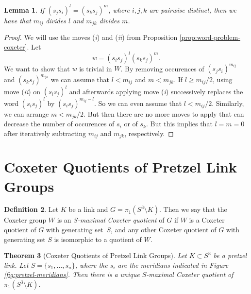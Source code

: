 \documentclass[11pt]{article}
\newtheorem{theorem}{Theorem}[section]
\newtheorem{lemma}[theorem]{Lemma}
\theoremstyle{definition}
\newtheorem{definition}[theorem]{Definition}
\begin{document}
\begin{lemma}\label{lem:divisors}
If $(s_js_i)^l = (s_ks_j)^m$, where $i,j,k$ are pairwise distinct, then we have that $m_{ij}$ divides $l$ and $m_{jk}$ divides $m$.
\end{lemma}

\begin{proof}
We will use the moves (\textit{i}) and (\textit{ii}) from Proposition \ref{prop:word-problem-coxeter}. Let
$$w = (s_is_j)^l(s_ks_j)^m.$$
We want to show that $w$ is trivial in $W$. By removing occurences of $(s_js_i)^{m_{ij}}$ and $(s_ks_j)^{m_{jk}}$ we can assume that $l < m_{ij}$ and $m < m_{jk}$. If $l \geq m_{ij}/2$, using move (\textit{ii}) on $(s_is_j)^l$ and afterwards applying move (\textit{i}) successively replaces the word $(s_is_j)^l$ by $(s_is_j)^{m_{ij}-l}$. So we can even assume that $l < m_{ij}/2$. Similarly, we can arrange $m < m_{jk}/2$. But then there are no more moves to apply that can decrease the number of occurences of $s_i$ or of $s_k$. But this implies that $l=m=0$ after iteratively subtracting $m_{ij}$ and $m_{jk}$, respectively.
\end{proof}

\section{Coxeter Quotients of Pretzel Link Groups}\label{sec:coxeter-quotients}

\begin{definition}
Let $K$ be a link and $G = \pi_1(S^3 \setminus K)$. Then we say that the Coxeter group
$W$ is an \textit{$S$-maximal Coxeter quotient} of $G$ if $W$ is a Coxeter quotient of $G$ with generating set~$S$, and any other Coxeter quotient of $G$ with generating set $S$ is isomorphic to a quotient of $W$.
\end{definition}


\begin{theorem}[Coxeter Quotients of Pretzel Link Groups]\label{thm:pretzel-coxeter}
Let $K\subset S^3$ be a pretzel link. Let $S = \{s_1,\dots,s_n\}$, where the $s_i$ are the meridians indicated in Figure \ref{fig:pretzel-meridians}. Then there is a unique $S$-maximal Coxeter quotient of~$\pi_1(S^3 \setminus K)$.
\end{theorem}
\end{document}

